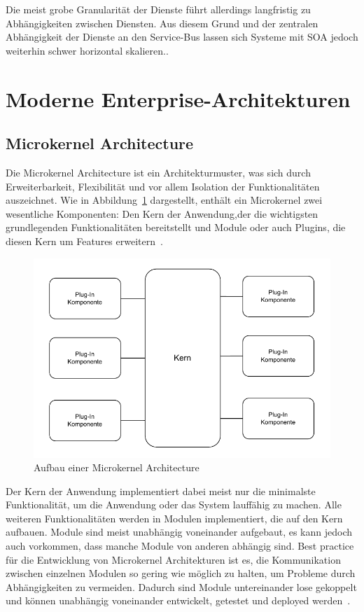 \documentclass[acmtog]{acmart}
\begin{document}
Die meist grobe Granularität der Dienste führt allerdings langfristig zu Abhängigkeiten zwischen Diensten.
Aus diesem Grund und der zentralen Abhängigkeit der Dienste an den Service-Bus lassen sich Systeme mit SOA jedoch weiterhin schwer horizontal skalieren..

\section{Moderne Enterprise-Architekturen}

\subsection{Microkernel Architecture}\label{subsec:microkernel-architecture}
Die Microkernel Architecture ist ein Architekturmuster, was sich durch Erweiterbarkeit, Flexibilität und vor allem Isolation der Funktionalitäten auszeichnet.
Wie in Abbildung~\ref{fig:microkernel} dargestellt, enthält ein Microkernel zwei wesentliche Komponenten: Den Kern der Anwendung,der die wichtigsten grundlegenden Funktionalitäten bereitstellt und Module oder auch Plugins,
die diesen Kern um Features erweitern~\cite[21-22]{architecturePatterns}.


\begin{figure}[!h]
  \centering
  \includegraphics[width=\linewidth]{images/microkernel/microkernel}
  \caption{Aufbau einer Microkernel Architecture}
  \label{fig:microkernel}
\end{figure}

Der Kern der Anwendung implementiert dabei meist nur die minimalste Funktionalität, um die Anwendung oder das System lauffähig zu machen.
Alle weiteren Funktionalitäten werden in Modulen implementiert, die auf den Kern aufbauen.
Module sind meist unabhängig voneinander aufgebaut, es kann jedoch auch vorkommen, dass manche Module von anderen abhängig sind.
Best practice für die Entwicklung von Microkernel Architekturen ist es, die Kommunikation zwischen einzelnen Modulen so gering wie möglich zu halten, um Probleme durch Abhängigkeiten zu vermeiden.
Dadurch sind Module untereinander lose gekoppelt und können unabhängig voneinander entwickelt, getestet und deployed werden~\cite[22]{architecturePatterns}.
\end{document}
